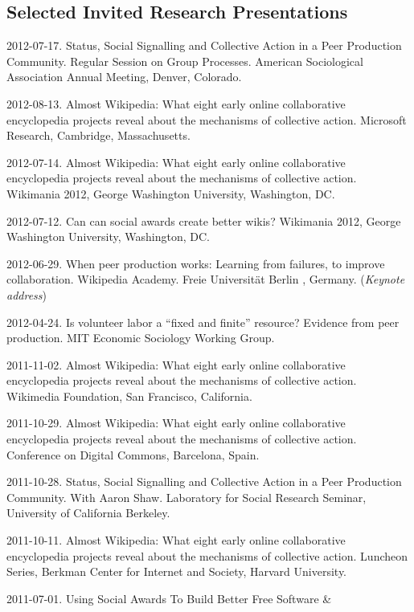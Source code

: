 \documentclass[11pt]{article}
\newenvironment{cvlist}{
\begin{list}{}{\leftmargin=3.0em \itemindent=-3.0em}
  \setlength{\itemsep}{0pt}
  \setlength{\parskip}{0em}
  \setlength{\parsep}{1em}
  \setlength{\parindent}{0em}}
{\vspace{1em}
\end{list}}
\begin{document}
\subsection{Selected Invited Research Presentations}
\begin{cvlist}
\item 2012-07-17. Status, Social Signalling and Collective Action in a
  Peer Production Community. Regular Session on Group
  Processes. American Sociological Association Annual Meeting, Denver,
  Colorado.
\item 2012-08-13. Almost Wikipedia: What eight early online
  collaborative encyclopedia projects reveal about the mechanisms of
  collective action. Microsoft Research, Cambridge, Massachusetts.
\item 2012-07-14. Almost Wikipedia: What eight early online
  collaborative encyclopedia projects reveal about the mechanisms of
  collective action.  Wikimania 2012, George Washington University,
  Washington, DC.
\item 2012-07-12. Can can social awards create better wikis? Wikimania
  2012, George Washington University, Washington, DC.
\item 2012-06-29. When peer production works: Learning from failures, to
  improve collaboration. Wikipedia Academy. Freie Universität Berlin ,
  Germany.  (\emph{Keynote address})
\item 2012-04-24. Is volunteer labor a ``fixed and finite'' resource?
  Evidence from peer production. MIT Economic Sociology Working Group.
\item 2011-11-02. Almost Wikipedia: What eight early online
  collaborative encyclopedia projects reveal about the mechanisms of
  collective action. Wikimedia Foundation, San Francisco, California.
\item 2011-10-29. Almost Wikipedia: What eight early online
  collaborative encyclopedia projects reveal about the mechanisms of
  collective action. Conference on Digital Commons, Barcelona, Spain.
\item 2011-10-28. Status, Social Signalling and Collective Action in a
  Peer Production Community. With Aaron Shaw. Laboratory for Social
  Research Seminar, University of California Berkeley.
\item 2011-10-11. Almost Wikipedia: What eight early online collaborative
  encyclopedia projects reveal about the mechanisms of collective
  action. Luncheon Series, Berkman Center for Internet and Society,
  Harvard University.
\item 2011-07-01. Using Social Awards To Build Better Free Software \&

\end{cvlist}
\end{document}
